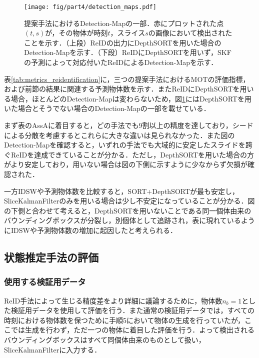         \begin{figure}[t]
            \centering
            \texttt{[image: fig/part4/detection\_maps.pdf]}
            \caption[提案手法におけるDetection-Mapの一部]{提案手法におけるDetection-Mapの一部．赤にプロットされた点$(t, s)$が，その物体が時刻$t$，スライス$s$の画像において検出されたことを示す．（上段）ReIDの出力にDepthSORTを用いた場合のDetection-Mapを示す．（下段）ReIDにDepthSORTを用いず，SKFの予測によって対応付いたReIDによるDetection-Mapを示す．}
            \label{fig:detection_map}
        \end{figure}

        表\ref{tab:metrics_reidentification}に，三つの提案手法におけるMOTの評価指標，および前節の結果に関連する予測物体数を示す．またReIDにDepthSORTを用いる場合，ほとんどのDetection-Mapは変わらないため，図\ref{fig:detection_map}にはDepthSORTを用いた場合とそうでない場合のDetection-Mapの一部を載せている．

        まず表のAssAに着目すると，どの手法でも$9$割以上の精度を達しており，シードによる分散を考慮するとこれらに大きな違いは見られなかった．また図のDetection-Mapを確認すると，いずれの手法でも大域的に安定したスライドを跨ぐReIDを達成できていることが分かる．ただし，DepthSORTを用いた場合の方がより安定しており，用いない場合は図の下側に示すように少なからず欠損が確認された．

        一方IDSWや予測物体数を比較すると，SORT+DepthSORTが最も安定し，SliceKalmanFilterのみを用いる場合は少し不安定になっていることが分かる．図の下側と合わせて考えると，DepthSORTを用いないことである同一個体由来のバウンディングボックスが分裂し，別個体として追跡され，表に現れているようにIDSWや予測物体数の増加に起因したと考えられる．

    \subsection{状態推定手法の評価}
    \label{subsec:estimation_evaluation}


        \subsubsection{使用する検証用データ}

        ReID手法によって生じる精度差をより詳細に議論するために，物体数$n_b = 1$とした検証用データを使用して評価を行う．また通常の検証用データでは，すべての時刻における物体数を保つために手順5において物体の生成を行っていたが，ここでは生成を行わず，ただ一つの物体に着目した評価を行う．よって検出されるバウンディングボックスはすべて同個体由来のものとして扱い，SliceKalmanFilterに入力する．

